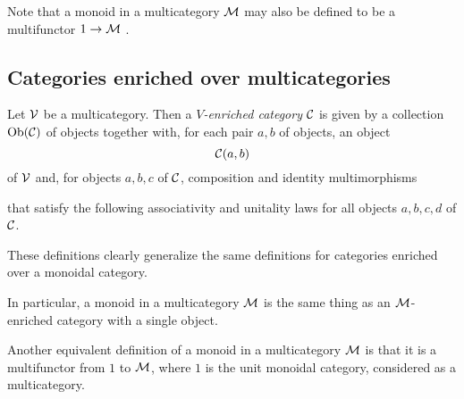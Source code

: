 \documentclass{article}
\begin{document}
Note that a monoid in a multicategory $\mathcal M$ may also be defined to be a multifunctor $1 \to \mathcal M$ \cite[2.1.11]{Multicategories}.

\subsection{Categories enriched over multicategories}

\begin{definition}
  \label{DefEnrichedCategoryMulticategory}
  Let ${\mathcal{V}}$ be a multicategory.  
  Then a \emph{$V$-enriched category} ${\mathcal{C}}$ is given by a collection $\text{Ob}({\mathcal{C}})$ of objects together with, for each pair $a,b$ of objects, an object
  \[
    {\mathcal{C}}(a,b)
    \]
  of ${\mathcal{V}}$ and, for objects $a,b,c$ of ${\mathcal{C}}$, composition and identity multimorphisms
  that satisfy the following associativity and unitality laws for all objects $a,b,c,d$ of ${\mathcal{C}}$.
\end{definition}

\begin{remark}
  These definitions clearly generalize the same definitions for categories enriched over a monoidal category.

  In particular, a monoid in a multicategory $\mathcal M$ is the same thing as an $\mathcal M$-enriched category with a single object.

  Another equivalent definition of a monoid in a multicategory $\mathcal M$ is that it is a multifunctor from $1$ to $\mathcal M$, where $1$ is the unit monoidal category, considered as a multicategory.
\end{remark}
\end{document}
